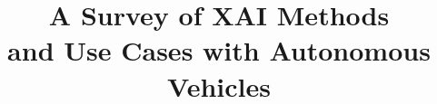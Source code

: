 \documentclass{IEEEtran}
\begin{document}
\title{A Survey of XAI Methods\\and Use Cases with Autonomous Vehicles}
\author{
    \\
}
\maketitle










 
\end{document}

